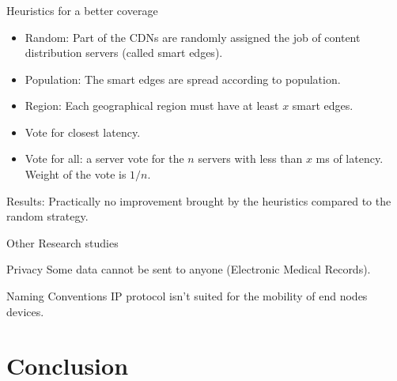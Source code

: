 \documentclass[utf8,xcolor=table, page number]{earlywinter}
\begin{document}
\begin{frame}
  \frametitle{\secname}
  \framesubtitle{\subsecname}

  \begin{exampleblock}{Heuristics for a better coverage}
    \begin{itemize}
      \item Random: Part of the CDNs are randomly assigned the job of content distribution servers (called smart edges).
      \item Population: The smart edges are spread according to population.
      \item Region: Each geographical region must have at least $x$ smart edges.
      \item Vote for closest latency.
      \item Vote for all: a server vote for the $n$ servers with less than $x$ ms of latency. Weight of the vote is $1/n$.
    \end{itemize}
    Results: Practically no improvement brought by the heuristics compared to the random strategy.
  \end{exampleblock}
  
\end{frame}

\begin{frame}{Other Research studies} %
  
  \begin{alertblock}{Privacy}
    Some data cannot be sent to anyone (Electronic Medical Records).
  \end{alertblock}
  \vfill
  \begin{alertblock}{Naming Conventions}
    IP protocol isn't suited for the mobility of end nodes devices.
  \end{alertblock}

  
\end{frame}



\section*{Conclusion}
\end{document}
